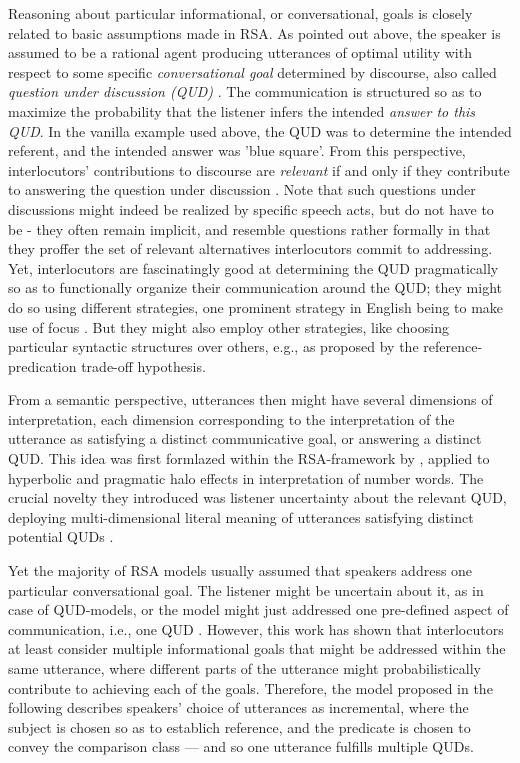 Reasoning about particular informational, or conversational, goals is closely related to basic assumptions made in RSA.
As pointed out above, the speaker is assumed to be a rational agent producing utterances of optimal utility with respect to some specific \emph{conversational goal} determined by discourse, also called \emph{question under discussion (QUD)}  \parencite{lassiter2017adjectival, roberts2012information}. The communication is structured so as to maximize the probability that the listener infers the intended \emph{answer to this QUD}. In the vanilla example used above, the QUD was to determine the intended referent, and the intended answer was 'blue square'. From this perspective, interlocutors' contributions to discourse are \emph{relevant} if and only if they contribute to answering the question under discussion \parencite{roberts2012information}. Note that such questions under discussions might indeed be realized by specific speech acts, but do not have to be - they often remain implicit, and resemble questions rather formally in that they proffer the set of relevant alternatives interlocutors commit to addressing. Yet, interlocutors are fascinatingly good at determining the QUD pragmatically so as to functionally organize their communication around the QUD; they might do so using different strategies, one prominent strategy in English being to make use of focus \parencite{roberts2012information, krifka2008basic}. But they might also employ other strategies, like choosing particular syntactic structures over others, e.g., as proposed by the reference-predication trade-off hypothesis.  

From a semantic perspective, utterances then might have several dimensions of interpretation, each dimension corresponding to the interpretation of the utterance as satisfying a distinct communicative goal, or answering a distinct QUD. This idea was first formlazed within the RSA-framework by \textcite{kao2014nonliteral}, applied to hyperbolic and pragmatic halo effects in interpretation of number words. The crucial novelty they introduced was listener uncertainty about the relevant QUD, deploying multi-dimensional literal meaning of utterances satisfying distinct potential QUDs \parencite{kao2014nonliteral}. 

Yet the majority of RSA models usually assumed that speakers address one particular conversational goal. The listener might be uncertain about it, as in case of QUD-models, or the model might just addressed one pre-defined aspect of communication, i.e., one QUD \parencite[see][for an excellent overview]{problang}. However, this work has shown that interlocutors at least consider multiple informational goals that might be addressed within the same utterance, where different parts of the utterance might probabilistically contribute to achieving each of the goals. Therefore, the model proposed in the following describes speakers' choice of utterances as incremental, where the subject is chosen so as to establich reference, and the predicate is chosen to convey the comparison class --- and so one utterance fulfills multiple QUDs. 
